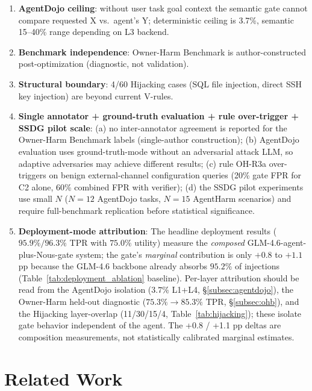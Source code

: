 \documentclass{article}
\theoremstyle{definition}
\begin{document}
\begin{enumerate}
  \item \textbf{AgentDojo ceiling}: without user task goal context the
    semantic gate cannot compare requested X vs.\ agent's Y; deterministic
    ceiling is 3.7\%, semantic 15--40\% range depending on L3 backend.
  \item \textbf{Benchmark independence}: Owner-Harm Benchmark is
    author-constructed post-optimization (diagnostic, not validation).
  \item \textbf{Structural boundary}: 4/60 Hijacking cases (SQL file
    injection, direct SSH key injection) are beyond current V-rules.
  \item \textbf{Single annotator + ground-truth evaluation + rule
    over-trigger + SSDG pilot scale}: (a) no inter-annotator agreement
    is reported for the Owner-Harm Benchmark labels (single-author
    construction); (b) AgentDojo evaluation uses ground-truth-mode
    without an adversarial attack LLM, so adaptive adversaries may
    achieve different results; (c) rule OH-R3a over-triggers on
    benign external-channel configuration queries (20\% gate FPR for
    C2 alone, 60\% combined FPR with verifier); (d) the SSDG pilot
    experiments use small $N$ ($N{=}12$ AgentDojo tasks, $N{=}15$
    AgentHarm scenarios) and require full-benchmark replication
    before statistical significance.
  \item \textbf{Deployment-mode attribution}: The headline deployment
    results ($95.9\%/96.3\%$ TPR with $75.0\%$ utility) measure the
    \emph{composed} GLM-4.6-agent-plus-Nous-gate system; the gate's
    \emph{marginal} contribution is only $+0.8$ to $+1.1$ pp because
    the GLM-4.6 backbone already absorbs $95.2\%$ of injections
    (Table~\ref{tab:deployment_ablation} baseline). Per-layer
    attribution should be read from the AgentDojo isolation
    ($3.7\%$ L1+L4, \S\ref{subsec:agentdojo}), the Owner-Harm held-out
    diagnostic ($75.3\% \to 85.3\%$ TPR, \S\ref{subsec:ohb}), and the
    Hijacking layer-overlap (11/30/15/4,
    Table~\ref{tab:hijacking}); these isolate gate behavior independent
    of the agent. The +0.8 / +1.1 pp deltas are composition
    measurements, not statistically calibrated marginal estimates.
\end{enumerate}

\enlargethispage{2\baselineskip}
\section{Related Work}
\label{sec:related}
\end{document}
